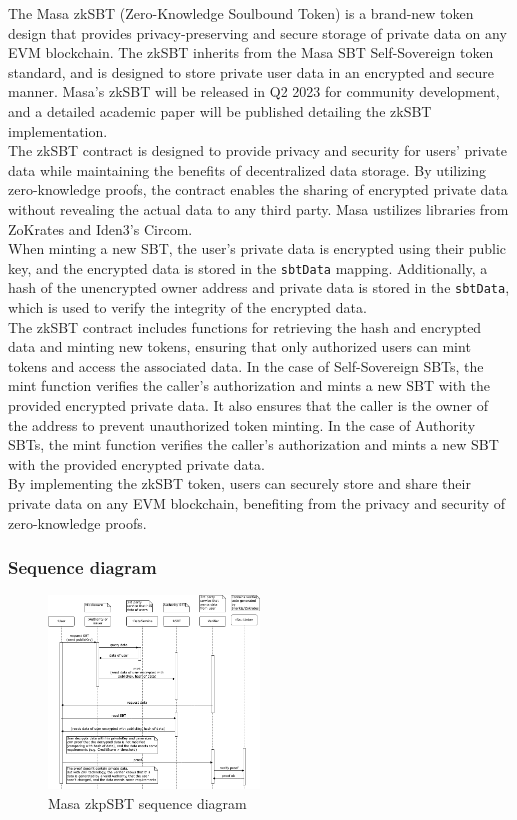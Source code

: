 \documentclass{article}
\begin{document}
The Masa zkSBT (Zero-Knowledge Soulbound Token)\cite{zksbt} is a brand-new token design that provides privacy-preserving and secure storage of private data on any EVM blockchain. The zkSBT inherits from the Masa SBT Self-Sovereign token standard, and is designed to store private user data in an encrypted and secure manner. Masa’s zkSBT will be released in Q2 2023 for community development, and a detailed academic paper will be published detailing the zkSBT implementation.
\\
\newline
The zkSBT contract is designed to provide privacy and security for users' private data while maintaining the benefits of decentralized data storage. By utilizing zero-knowledge proofs, the contract enables the sharing of encrypted private data without revealing the actual data to any third party\cite{linkingsouls}. Masa ustilizes libraries from ZoKrates\cite{zokrates} and Iden3’s Circom\cite{circom}.
\\
\newline
When minting a new SBT, the user's private data is encrypted using their public key, and the encrypted data is stored in the \texttt{sbtData} mapping. Additionally, a hash of the unencrypted owner address and private data is stored in the \texttt{sbtData}, which is used to verify the integrity of the encrypted data.
\\
\newline
The zkSBT contract includes functions for retrieving the hash and encrypted data and minting new tokens, ensuring that only authorized users can mint tokens and access the associated data. In the case of Self-Sovereign SBTs, the mint function verifies the caller's authorization and mints a new SBT with the provided encrypted private data. It also ensures that the caller is the owner of the address to prevent unauthorized token minting. In the case of Authority SBTs, the mint function verifies the caller’s authorization and mints a new SBT with the provided encrypted private data. 
\\
\newline
By implementing the zkSBT token, users can securely store and share their private data on any EVM blockchain, benefiting from the privacy and security of zero-knowledge proofs.
\subsubsection{Sequence diagram}
\begin{figure}[h]
    \centering
    \includegraphics[width=0.5\textwidth]{sequence-digram.png}
    \caption{Masa zkpSBT sequence diagram}
  \end{figure}
\end{document}
